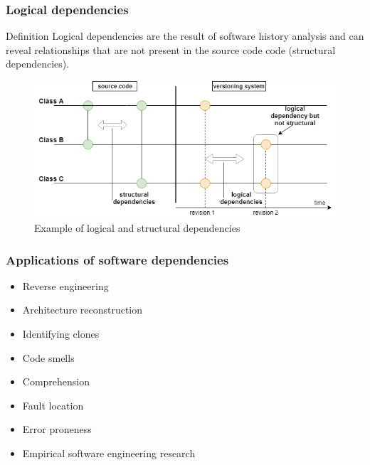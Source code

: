 \documentclass{beamer}
\begin{document}
 \begin{frame}
\frametitle{Logical dependencies}
\begin{block}{Definition}
 Logical dependencies are the result of software history analysis and can reveal relationships that are not present in the source code code (structural dependencies).
\end{block}

\begin{center}
     \begin{figure}
	\includegraphics[width=\textwidth]{fig1.png}
	\caption{\label{fig:fig1}Example of logical and structural dependencies}
     \end{figure}
\end{center}

\end{frame}



 \begin{frame}
\frametitle{Applications of software dependencies}
\begin{itemize}
	\item Reverse engineering
	\item Architecture reconstruction
	\item Identifying clones
	\item Code smells
	\item Comprehension
	\item Fault location
	\item Error proneness
	\item Empirical software engineering research
\end{itemize}

\end{frame}

\end{document}
